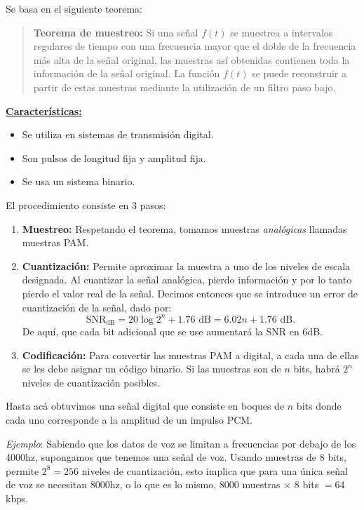 \documentclass[10pt,a4paper]{article}
\begin{document}
Se basa en el siguiente teorema:
\begin{quote}
\textbf{Teorema de muestreo:} Si una señal $f(t)$ se muestrea a intervalos regulares de tiempo con una frecuencia mayor que el doble de la frecuencia más alta de la señal original, las muestras así obtenidas contienen toda la información de la señal original. La función $f(t)$ se puede reconstruir a partir de estas muestras mediante la utilización de un filtro paso bajo.
\end{quote}

\underline{\textbf{Características:}}
\begin{itemize}
\item Se utiliza en sistemas de transmisión digital.
\item Son pulsos de longitud fija y amplitud fija.
\item Se usa un sistema binario.
\end{itemize}

El procedimiento consiste en 3 pasos:
\begin{enumerate}
\item \textbf{Muestreo:} Respetando el teorema, tomamos muestras \textit{analógicas} llamadas muestras PAM.
\item \textbf{Cuantización:} Permite aproximar la muestra
a uno de los niveles de escala designada. Al cuantizar la señal analógica, pierdo información y por lo tanto pierdo el valor real de la señal. Decimos entonces que se introduce un error de cuantización de la señal, dado por:
\[\text{SNR}_\text{dB} = 20 \log 2^n + 1.76 \text{ dB} = 6.02n + 1.76 \text{ dB}.\]
De aquí, que cada bit adicional que se use aumentará la SNR en 6dB.
\item \textbf{Codificación:} Para convertir las muestras PAM a digital, a cada una de ellas se les debe asignar un código binario. Si las muestras son de $n$ bits, habrá $2^n$ niveles de cuantización posibles.
\end{enumerate}

Hasta acá obtuvimos una señal digital que consiste en boques de $n$ bits donde cada uno corresponde a la amplitud de un impulso PCM.

\textit{Ejemplo}: Sabiendo que los datos de voz se limitan a frecuencias por debajo de los 4000hz, supongamos que tenemos una señal de voz. Usando muestras de 8 bits, permite $2^8 = 256$ niveles de cuantización, esto implica que para una única señal de voz se necesitan 8000hz, o lo que es lo mismo, 8000 muestras $\times$ 8 bits $= 64$ kbps.
\end{document}
